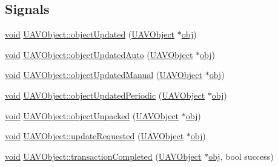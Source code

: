 \subsection*{Signals}
\begin{DoxyCompactItemize}
\item 
\hyperlink{group___u_a_v_objects_plugin_ga444cf2ff3f0ecbe028adce838d373f5c}{void} \hyperlink{group___u_a_v_objects_plugin_ga9aac3ae5395f63249cd821e0e5be5bf2}{U\-A\-V\-Object\-::object\-Updated} (\hyperlink{class_u_a_v_object}{U\-A\-V\-Object} $\ast$\hyperlink{glext_8h_a0c0d4701a6c89f4f7f0640715d27ab26}{obj})
\item 
\hyperlink{group___u_a_v_objects_plugin_ga444cf2ff3f0ecbe028adce838d373f5c}{void} \hyperlink{group___u_a_v_objects_plugin_ga568cdde04946e82d60a3707fefdd2572}{U\-A\-V\-Object\-::object\-Updated\-Auto} (\hyperlink{class_u_a_v_object}{U\-A\-V\-Object} $\ast$\hyperlink{glext_8h_a0c0d4701a6c89f4f7f0640715d27ab26}{obj})
\item 
\hyperlink{group___u_a_v_objects_plugin_ga444cf2ff3f0ecbe028adce838d373f5c}{void} \hyperlink{group___u_a_v_objects_plugin_ga347d21d00c26e23b58dae5510bdc3a7d}{U\-A\-V\-Object\-::object\-Updated\-Manual} (\hyperlink{class_u_a_v_object}{U\-A\-V\-Object} $\ast$\hyperlink{glext_8h_a0c0d4701a6c89f4f7f0640715d27ab26}{obj})
\item 
\hyperlink{group___u_a_v_objects_plugin_ga444cf2ff3f0ecbe028adce838d373f5c}{void} \hyperlink{group___u_a_v_objects_plugin_ga1ba37e7a5eafe1d5a598b2dfb877d2f0}{U\-A\-V\-Object\-::object\-Updated\-Periodic} (\hyperlink{class_u_a_v_object}{U\-A\-V\-Object} $\ast$\hyperlink{glext_8h_a0c0d4701a6c89f4f7f0640715d27ab26}{obj})
\item 
\hyperlink{group___u_a_v_objects_plugin_ga444cf2ff3f0ecbe028adce838d373f5c}{void} \hyperlink{group___u_a_v_objects_plugin_ga2b9ae613f54e59b358dbf2e31d32d9ad}{U\-A\-V\-Object\-::object\-Unpacked} (\hyperlink{class_u_a_v_object}{U\-A\-V\-Object} $\ast$\hyperlink{glext_8h_a0c0d4701a6c89f4f7f0640715d27ab26}{obj})
\item 
\hyperlink{group___u_a_v_objects_plugin_ga444cf2ff3f0ecbe028adce838d373f5c}{void} \hyperlink{group___u_a_v_objects_plugin_ga13ce31a6262476db602eec857d9b40c1}{U\-A\-V\-Object\-::update\-Requested} (\hyperlink{class_u_a_v_object}{U\-A\-V\-Object} $\ast$\hyperlink{glext_8h_a0c0d4701a6c89f4f7f0640715d27ab26}{obj})
\item 
\hyperlink{group___u_a_v_objects_plugin_ga444cf2ff3f0ecbe028adce838d373f5c}{void} \hyperlink{group___u_a_v_objects_plugin_gafac716c4828b4506f6982f79fc7827c2}{U\-A\-V\-Object\-::transaction\-Completed} (\hyperlink{class_u_a_v_object}{U\-A\-V\-Object} $\ast$\hyperlink{glext_8h_a0c0d4701a6c89f4f7f0640715d27ab26}{obj}, bool success)

\end{DoxyCompactItemize}
